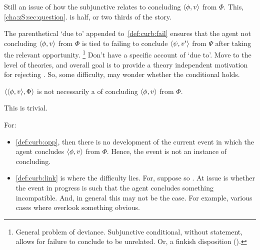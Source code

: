 \begin{note}
  Still an issue of how the subjunctive relates to concluding \(\langle \phi, v \rangle\) from \(\Phi\).
  This, \autoref{cha:zS:sec:question}.
  \curb{} is half, or two thirds of the story.
\end{note}

\begin{note}
  The parenthetical `due to' appended to~\ref{def:curb:fail} ensures that the agent not concluding \(\langle \phi, v \rangle\) from \(\Phi\) is tied to failing to conclude \(\langle \psi, v' \rangle\) from \(\Psi\) after taking the relevant opportunity.%
  \footnote{
    General problem of deviance.
    Subjunctive conditional, without statement, allows for failure to conclude to be unrelated.
    Or, a finkish disposition (\cite[cf.][144]{Lewis:1997wg}).
  }
  Don't have a specific account of `due to'.
  Move to the level of theories, and overall goal is to provide a theory independent motivation for rejecting \issueConstraint{}.
  So, some difficulty, may wonder whether the conditional holds.
\end{note}

\begin{note}
  \begin{proposition}
    \(\langle \langle \phi, v \rangle, \Phi \rangle\) is not necessarily a  of concluding \(\langle \phi, v \rangle\) from \(\Phi\).
    \begin{argument}
      This is trivial.

      For:

      \begin{itemize}
      \item
        \ref{def:curb:opp}, then there is no development of the current event in which the agent concludes \(\langle \phi, v \rangle\) from \(\Phi\). Hence, the event is not an instance of concluding.
      \item
        \ref{def:curb:link} is where the difficulty lies.
        For, suppose so \pevent{}.
        At issue is whether the event in progress is such that the agent concludes something incompatible.
        And, in general this may not be the case.
        For example, various cases where overlook something obvious.
      \end{itemize}
    \end{argument}
  \end{proposition}
\end{note}





